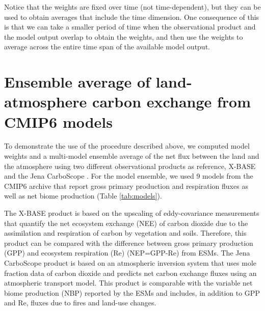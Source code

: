 \documentclass[gmd, manuscript]{copernicus}
\begin{document}

Notice that the weights are fixed over time (not time-dependent), but they can be used to obtain averages that include the time dimension. One consequence of this is that we can take a smaller period of time when the observational product and the model output overlap to obtain the weights, and then use the weights to average across the entire time span of the available model output. 

\section{Ensemble average of land-atmosphere carbon exchange from CMIP6 models}
To demonstrate the use of the procedure described above, we computed model weights and a multi-model ensemble average of the net flux between the land and the atmosphere using two different observational products as reference, X-BASE \citep{Nelson2024} and the Jena CarboScope \citep{Rodenbeck2005}. For the model ensemble, we used 9 models from the CMIP6 archive that report gross primary production and respiration fluxes as well as net biome production (Table \ref{tab:models}).

The X-BASE product is based on the upscaling of eddy-covariance measurements that quantify the net ecosystem exchange (NEE) of carbon dioxide due to the assimilation and respiration of carbon by vegetation and soils. Therefore, this product can be compared with the difference between gross primary production (GPP) and ecosystem respiration (Re) (NEP=GPP-Re) from ESMs. The Jena CarboScope product is based on an atmospheric inversion system that uses mole fraction data of carbon dioxide and predicts net carbon exchange fluxes using an atmospheric transport model. This product is comparable with the variable net biome production (NBP) reported by the ESMs and includes, in addition to GPP and Re, fluxes due to fires and land-use changes. 
\end{document}

